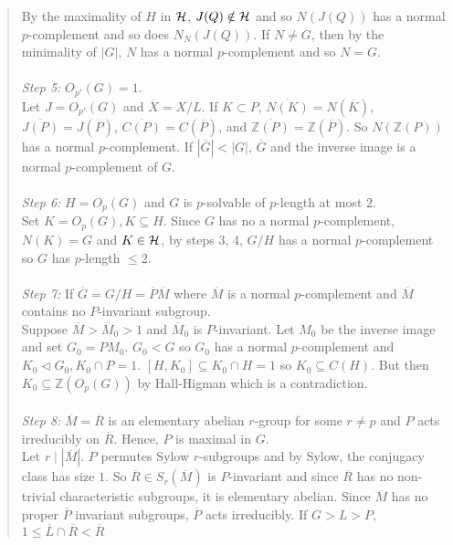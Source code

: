 \begin{quote}
By the maximality of $H$ in ${\cal H}$, $J(Q) \notin {\cal H}$ and so
$N(J(Q))$ has a
normal $p$-complement and
so does $N_N(J(Q))$.  If $ N \ne G$, then by the minimality of $|G|$, $N$ has a
normal $p$-complement and so $N=G$.
\\
\\
\emph{Step 5:}  $O_{p'}(G)=1$.
\\
Let $J= O_{p'}(G)$ and ${\overline X} = X/L$.  If $K \subset P$,
$ {\overline {N(K)}} = N({\overline K})$,
${\overline {J(P)}} = J({\overline P})$,
${\overline {C(P)}} = C({\overline P})$, and
${\overline {{\mathbb Z}(P)}} = {\mathbb Z}({\overline P})$.  So 
$N({\mathbb Z}(P))$ has a 
normal $p$-complement.  If $|{\overline G}| < |G|$, ${\overline G}$ and the inverse image is
a normal $p$-complement of $G$.
\\
\\
\emph{Step 6:}  $H= O_p(G)$ and $G$ is $p$-solvable of $p$-length at most $2$.
\\
Set $K= O_p(G), K \subseteq H$.  Since $G$ has no
a normal $p$-complement,  $N(K)=G$ and $K \in {\cal H}$, by steps 3, 4,
$G/H$ has a
normal $p$-complement so $G$ has $p$-length $\le 2$.
\\
\\
\emph{Step 7:}  If ${\overline G}= G/H= {\overline P}{\overline M}$ where ${\overline M}$
is a normal $p$-complement
and ${\overline M}$ contains no $P$-invariant subgroup.
\\
Suppose ${\overline M} > {\overline M}_0 >1$ and
${\overline M}_0$ is $P$-invariant.  Let $M_0$ be the inverse image and set
$G_0= P M_0$.  $G_0 < G$ so $G_0$ has a
normal $p$-complement 
and $K_0 \lhd G_0, K_0 \cap P = 1$.  $[H, K_0] \subseteq K_0 \cap H =1$ so
$K_0 \subseteq C(H)$.  But then $K_0 \subseteq {\mathbb Z}(O_p(G))$ by Hall-Higman which is
a contradiction.
\\
\\
\emph{Step 8:} ${\overline M} = {\overline R}$ is an elementary abelian $r$-group for some
$r \ne p$ and $P$ acts irreducibly on ${\overline R}$. Hence, $P$ is maximal in $G$.
\\
Let $r \mid |{\overline M}|$.  $P$ permutes Sylow $r$-subgroups and by Sylow, the conjugacy
class has size $1$.   So ${\overline R} \in S_r({\overline M})$ is $P$-invariant and since
${\overline R}$ has no non-trivial characteristic subgroups, it is elementary abelian.
Since ${\overline M}$ has no proper ${\overline P}$ invariant subgroups, ${\overline P}$
acts irreducibly.
If $G > L >P$, $1 \le {\overline L} \cap {\overline R} < {\overline R}$

\end{quote}
